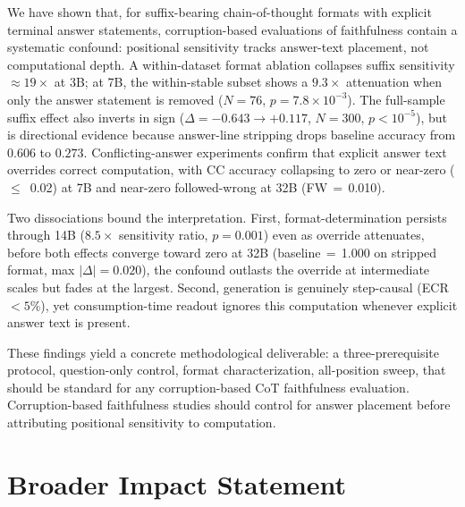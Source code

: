 \documentclass{article}
\theoremstyle{definition}
\theoremstyle{definition}
\newcommand{\QWTBCCFW}{0.010}
\begin{document}
We have shown that, for suffix-bearing chain-of-thought formats with
explicit terminal answer statements, corruption-based evaluations of
faithfulness contain a systematic confound: positional sensitivity tracks
answer-text placement, not computational depth. A within-dataset format
ablation collapses suffix sensitivity ${\approx}19\times$ at 3B; at 7B,
the within-stable subset shows a $9.3\times$ attenuation when only the
answer statement is removed ($N{=}76$, $p{=}7.8\times10^{-3}$). The
full-sample suffix effect also inverts in sign ($\Delta{=}{-}0.643 \to {+}0.117$,
$N{=}300$, $p{<}10^{-5}$), but is directional evidence because answer-line
stripping drops baseline accuracy from $0.606$ to $0.273$. Conflicting-answer
experiments confirm that explicit answer text overrides correct computation,
with CC accuracy collapsing to zero or near-zero ($\leq$~0.02) at 7B and
near-zero followed-wrong at 32B (FW\,$=$\,\QWTBCCFW).

Two dissociations bound the interpretation. First,
format-determination persists through 14B ($8.5\times$ sensitivity ratio,
$p{=}0.001$) even as override attenuates, before both effects converge
toward zero at 32B (baseline$\,=\,$1.000 on stripped format,
max $|\Delta|{=}0.020$), the confound outlasts the
override at intermediate scales but fades at the largest. Second, generation is genuinely step-causal
(ECR $< 5\%$), yet consumption-time readout ignores this computation
whenever explicit answer text is present.

These findings yield a concrete methodological deliverable: a
three-prerequisite protocol, question-only control, format characterization,
all-position sweep, that should be standard for any corruption-based CoT
faithfulness evaluation. Corruption-based faithfulness studies should control
for answer placement before attributing positional sensitivity to computation.

\section*{Broader Impact Statement}
\end{document}
